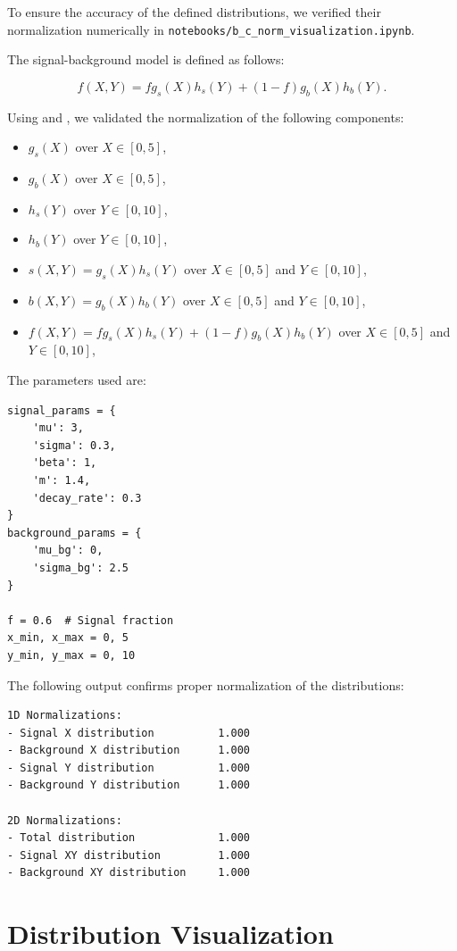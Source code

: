 \documentclass{article}
\begin{document}
To ensure the accuracy of the defined distributions, we verified their normalization numerically in \texttt{notebooks/b\_c\_norm\_visualization.ipynb}.

The signal-background model is defined as follows:

$$
f(X, Y) = f g_s(X)h_s(Y) + (1 - f)g_b(X)h_b(Y).
$$

Using  and , we validated the normalization of the following components:
\begin{itemize}
    \item $g_s(X)$ over $X \in [0, 5]$,
    \item $g_b(X)$ over $X \in [0, 5]$,
    \item $h_s(Y)$ over $Y \in [0, 10]$,
    \item $h_b(Y)$ over $Y \in [0, 10]$,
    \item $s(X, Y) = g_s(X)h_s(Y)$ over $X \in [0, 5]$ and $Y \in [0, 10]$,
    \item $b(X, Y) = g_b(X)h_b(Y)$ over $X \in [0, 5]$ and $Y \in [0, 10]$,
    \item $f(X, Y) = f g_s(X)h_s(Y) + (1 - f)g_b(X)h_b(Y)$ over $X \in [0, 5]$ and $Y \in [0, 10]$,
\end{itemize}

The parameters used are:
\begin{lstlisting}[style=pythonstyle]
signal_params = {
    'mu': 3, 
    'sigma': 0.3, 
    'beta': 1, 
    'm': 1.4, 
    'decay_rate': 0.3
}
background_params = {
    'mu_bg': 0, 
    'sigma_bg': 2.5
}

f = 0.6  # Signal fraction
x_min, x_max = 0, 5
y_min, y_max = 0, 10
\end{lstlisting}

The following output confirms proper normalization of the distributions:
\begin{lstlisting}[style=input]
1D Normalizations:
- Signal X distribution          1.000
- Background X distribution      1.000
- Signal Y distribution          1.000
- Background Y distribution      1.000

2D Normalizations:
- Total distribution             1.000
- Signal XY distribution         1.000
- Background XY distribution     1.000
\end{lstlisting}


\section{Distribution Visualization}
\end{document}
